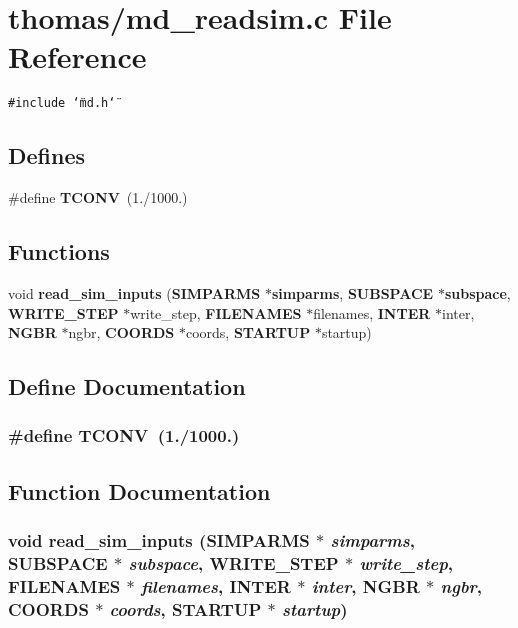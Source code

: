 \section{thomas/md\_\-readsim.c File Reference}
\label{thomas_2md__readsim_8c}
{\tt \#include \char`\"{}md.h\char`\"{}}\par
\subsection*{Defines}
\begin{CompactItemize}
\item 
\#define {\bf TCONV}~(1./1000.)
\end{CompactItemize}
\subsection*{Functions}
\begin{CompactItemize}
\item 
void {\bf read\_\-sim\_\-inputs} ({\bf SIMPARMS} $\ast${\bf simparms}, {\bf SUBSPACE} $\ast${\bf subspace}, {\bf WRITE\_\-STEP} $\ast$write\_\-step, {\bf FILENAMES} $\ast$filenames, {\bf INTER} $\ast$inter, {\bf NGBR} $\ast$ngbr, {\bf COORDS} $\ast$coords, {\bf STARTUP} $\ast$startup)
\end{CompactItemize}


\subsection{Define Documentation}
\subsubsection{\setlength{\rightskip}{0pt plus 5cm}\#define TCONV~(1./1000.)}\label{thomas_2md__readsim_8c_5e7494ae7535ea1a69379cc3faef9ae2}




\subsection{Function Documentation}
\subsubsection{\setlength{\rightskip}{0pt plus 5cm}void read\_\-sim\_\-inputs ({\bf SIMPARMS} $\ast$ {\em simparms}, {\bf SUBSPACE} $\ast$ {\em subspace}, {\bf WRITE\_\-STEP} $\ast$ {\em write\_\-step}, {\bf FILENAMES} $\ast$ {\em filenames}, {\bf INTER} $\ast$ {\em inter}, {\bf NGBR} $\ast$ {\em ngbr}, {\bf COORDS} $\ast$ {\em coords}, {\bf STARTUP} $\ast$ {\em startup})}\label{thomas_2md__readsim_8c_edbd265231f32e7e018beacafed09f18}


